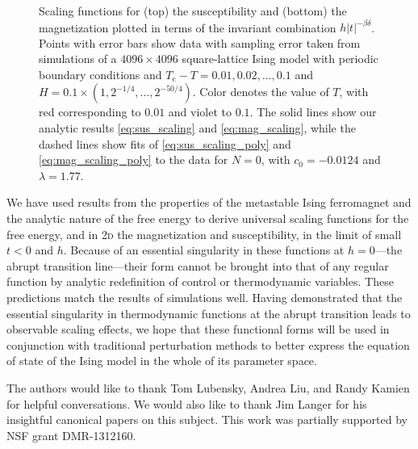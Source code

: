 \documentclass[aps,prl,reprint]{revtex4-1}
\def\c{\mathrm c}
\def\twodee{\textsc{2d} }
\begin{document}
\begin{figure}
  
  \caption{
    Scaling functions for (top) the susceptibility and (bottom) the
    magnetization plotted in terms of the invariant combination
    $h|t|^{-\beta\delta}$. Points with error bars show data with sampling
    error taken from simulations of a $4096\times4096$ square-lattice Ising
    model with periodic boundary conditions and $T_\c-T=0.01,0.02,\ldots,0.1$
    and $H=0.1\times(1,2^{-1/4},\ldots,2^{-50/4})$. Color denotes the value of
    $T$, with red corresponding to $0.01$ and violet to $0.1$. The solid lines
    show our analytic results \eqref{eq:sus_scaling} and
    \eqref{eq:mag_scaling}, while the dashed lines show fits of
    \eqref{eq:sus_scaling_poly} and \eqref{eq:mag_scaling_poly} to the data
    for $N=0$, with $c_0=-0.0124$ and $\lambda=1.77$.
  }
  \label{fig:scaling_fits}
\end{figure}

We have used results from the properties of the metastable Ising ferromagnet
and the analytic nature of the free energy to derive universal scaling
functions for the free energy, and in \twodee the magnetization and
susceptibility, in the limit of small $t<0$ and $h$. Because of an essential
singularity in these functions at $h=0$---the abrupt transition line---their
form cannot be brought into that of any regular function by analytic
redefinition of control or thermodynamic variables. These predictions match
the results of simulations well. Having demonstrated that the essential
singularity in thermodynamic functions at the abrupt transition leads to
observable scaling effects, we hope that these functional forms will be used in
conjunction with traditional perturbation methods to better express the
equation of state of the Ising model in the whole of its parameter space.

\begin{acknowledgments}
  The authors would like to thank Tom Lubensky, Andrea Liu, and Randy Kamien
  for helpful conversations. We would also like to thank Jim Langer for his
  insightful canonical papers on this subject. This work was partially supported by NSF grant
  DMR-1312160.
\end{acknowledgments}


\end{document}
